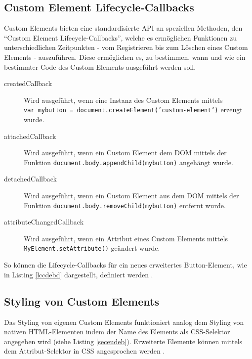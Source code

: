 


\subsection{Custom Element Lifecycle-Callbacks}\label{custom-element-lifecycle-callbacks}

Custom Elements bieten eine standardisierte \ac{API} an speziellen Methoden, den ``Custom Element Lifecycle-Callbacks'', welche es ermöglichen Funktionen zu unterschiedlichen Zeitpunkten - vom Registrieren bis zum Löschen eines Custom Elements - auszuführen. Diese ermöglichen es, zu bestimmen, wann und wie ein bestimmter Code des Custom Elements ausgeführt werden soll.

\begin{description}
  \item[createdCallback] Wird ausgeführt, wenn eine Instanz des Custom Elements mittels \texttt{var\ mybutton\ =\ document.createElement('custom-element')} erzeugt wurde.
  \item[attachedCallback] Wird ausgeführt, wenn ein Custom Element dem \ac{DOM} mittels der Funktion \texttt{document.body.appendChild(mybutton)} angehängt wurde.
  \item[detachedCallback] Wird ausgeführt, wenn ein Custom Element aus dem \ac{DOM} mittels der Funktion \texttt{document.body.removeChild(mybutton)} entfernt wurde.
  \item[attributeChangedCallback] Wird ausgeführt, wenn ein Attribut eines Custom Elements mittels \texttt{MyElement.setAttribute()} geändert wurde.
\end{description}

So können die Lifecycle-Callbacks für ein neues erweitertes Button-Element, wie in Listing \ref{lccdebd} dargestellt, definiert werden \cite{citeulike:13844988}.




\subsection{Styling von Custom Elements}\label{styling-von-custom-elements}

Das Styling von eigenen Custom Elements funktioniert analog dem Styling von nativen \ac{HTML}-Elementen indem der Name des Elements als \ac{CSS}-Selektor angegeben wird (siehe Listing \ref{seceudeb}). Erweiterte Elemente können mittels dem Attribut-Selektor in \ac{CSS} angesprochen werden \cite[S. 127-138]{citeulike:13844975}.


